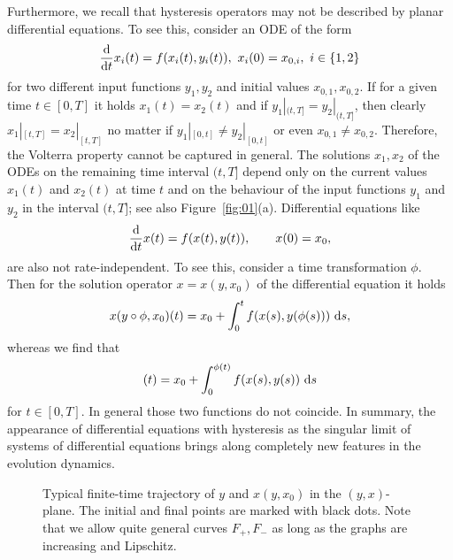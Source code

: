 \documentclass[12pt]{article}
\def\txtd{{\textnormal{d}}}
\newcommand{\benn}{\begin{equation*}}
\newcommand{\eenn}{\end{equation*}}
\begin{document}
Furthermore, we recall that hysteresis operators may not be described by planar differential 
equations. To see this, consider an ODE of the form
\benn
\frac{\txtd}{\txtd t}x_i(t)=f(x_i(t),y_i(t)),\ x_i(0)= x_{0,i},\ i\in\{1,2\}
\eenn
for two different input functions $y_1,y_2$ and initial values $x_{0,1},x_{0,2}$. If for a 
given time $t\in [0,T]$ it holds $x_1(t)=x_2(t)$ and if $y_1|_{(t,T]}=y_2|_{(t,T]}$, then 
clearly $x_1|_{[t,T]}=x_2|_{[t,T]}$ no matter if $y_1|_{[0,t]}\neq y_2|_{[0,t]}$ or even 
$x_{0,1}\neq x_{0,2}$. Therefore, the Volterra property cannot be captured in general. The solutions 
$x_1,x_2$ of the ODEs on the remaining time interval $(t,T]$ depend only on the current 
values $x_1(t)$ and $x_2(t)$ at time $t$ and on the behaviour of the input functions 
$y_1$ and $y_2$ in the interval $(t,T]$; see also Figure~\ref{fig:01}(a). Differential equations 
like
\benn
\frac{\txtd}{\txtd t}x(t)=f(x(t),y(t)),\qquad x(0)= x_0,
\eenn
are also not rate-independent. To see this, consider a time transformation $\phi$. Then for 
the solution operator $x=x(y,x_0)$ of the differential equation it holds
\benn
x(y\circ\phi,x_0)(t)=x_0 + \int_{0}^{t} f(x(s),y(\phi(s)))~ \txtd s,
\eenn
whereas we find that
\benn
[x(y,x_0)\circ\phi](t)=x_0 + \int_{0}^{\phi(t)} f(x(s),y(s))~\txtd s
\eenn
for $t\in [0,T]$. In general those two functions do not coincide. In summary, the appearance 
of differential equations with hysteresis as the singular limit of systems of differential 
equations brings along completely new features in the evolution dynamics.\medskip
	
	\begin{figure}
		\center
		\caption{\label{fig:03}Typical finite-time trajectory of $y$ and $x(y,x_0)$ in the 
		$(y,x)$-plane. The initial and final points are marked with black dots. Note that
		we allow quite general curves $F_+,F_-$ as long as the graphs are increasing and 
		Lipschitz.}
	\end{figure}
\end{document}
